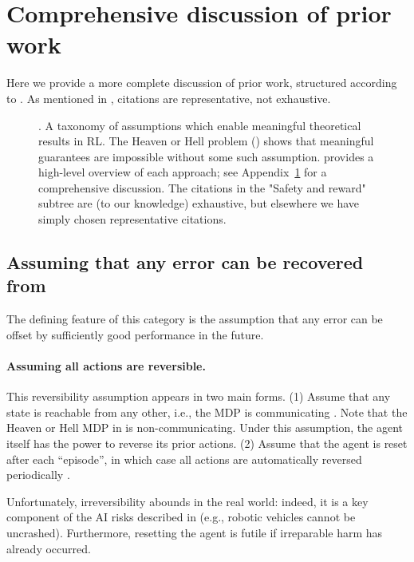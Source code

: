 
\section{Comprehensive discussion of prior work}\label{sec:related-full}

Here we provide a more complete discussion of prior work, structured according to . As mentioned in , citations are representative, not exhaustive.
\begin{figure}[h]
\usebox{\taxonomy}
\caption*{. A taxonomy of assumptions which enable meaningful theoretical results in RL. The Heaven or Hell problem () shows that meaningful guarantees are impossible without some such assumption.  provides a high-level overview of each approach; see Appendix~\ref{sec:related-full} for a comprehensive discussion. The citations in the "Safety and reward" subtree are (to our knowledge) exhaustive, but elsewhere we have simply chosen representative citations.}
\end{figure}

\subsection{Assuming that any error can be recovered from}\label{sec:recoverable}

The defining feature of this category is the assumption that any error can be offset by sufficiently good performance in the future.

\paragraph{Assuming all actions are reversible.} This reversibility assumption appears in two main forms. (1) Assume that any state is reachable from any other, i.e., the MDP is communicating \citep{jaksch_near-optimal_2010}. Note that the Heaven or Hell MDP in  is non-communicating. Under this assumption, the agent itself has the power to reverse its prior actions. (2) Assume that the agent is reset after each ``episode'', in which case all actions are automatically reversed periodically \citep{azar_minimax_2017}.

Unfortunately, irreversibility abounds in the real world: indeed, it is a key component of the AI risks described in  (e.g., robotic vehicles cannot be uncrashed). Furthermore, resetting the agent is futile if irreparable harm has already occurred.

